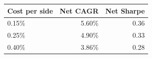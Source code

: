 \begin{tabular}{lrr}
\toprule
Cost per side & Net CAGR & Net Sharpe \\
\midrule
0.15\% & 5.60\% & 0.36 \\
0.25\% & 4.90\% & 0.33 \\
0.40\% & 3.86\% & 0.28 \\
\bottomrule
\end{tabular}
